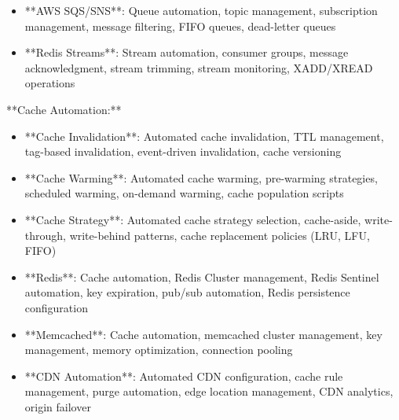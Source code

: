\documentclass[11pt,a4paper]{article}
\begin{document}
\begin{itemize}
\item **AWS SQS/SNS**: Queue automation, topic management, subscription management, message filtering, FIFO queues, dead-letter queues
\end{itemize}

\begin{itemize}
\item **Redis Streams**: Stream automation, consumer groups, message acknowledgment, stream trimming, stream monitoring, XADD/XREAD operations
\end{itemize}

**Cache Automation:**

\begin{itemize}
\item **Cache Invalidation**: Automated cache invalidation, TTL management, tag-based invalidation, event-driven invalidation, cache versioning
\end{itemize}

\begin{itemize}
\item **Cache Warming**: Automated cache warming, pre-warming strategies, scheduled warming, on-demand warming, cache population scripts
\end{itemize}

\begin{itemize}
\item **Cache Strategy**: Automated cache strategy selection, cache-aside, write-through, write-behind patterns, cache replacement policies (LRU, LFU, FIFO)
\end{itemize}

\begin{itemize}
\item **Redis**: Cache automation, Redis Cluster management, Redis Sentinel automation, key expiration, pub/sub automation, Redis persistence configuration
\end{itemize}

\begin{itemize}
\item **Memcached**: Cache automation, memcached cluster management, key management, memory optimization, connection pooling
\end{itemize}

\begin{itemize}
\item **CDN Automation**: Automated CDN configuration, cache rule management, purge automation, edge location management, CDN analytics, origin failover
\end{itemize}
\end{document}
